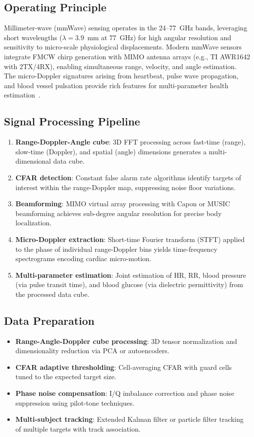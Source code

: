 \documentclass[journal,twoside]{IEEEtran}
\begin{document}
\subsection{Operating Principle}
Millimeter-wave (mmWave) sensing operates in the 24--77~GHz bands, leveraging short wavelengths ($\lambda = 3.9$~mm at 77~GHz) for high angular resolution and sensitivity to micro-scale physiological displacements. Modern mmWave sensors integrate FMCW chirp generation with MIMO antenna arrays (e.g., TI AWR1642 with 2TX/4RX), enabling simultaneous range, velocity, and angle estimation. The micro-Doppler signatures arising from heartbeat, pulse wave propagation, and blood vessel pulsation provide rich features for multi-parameter health estimation~\cite{ref_mmwave_review2023}.

\subsection{Signal Processing Pipeline}
\begin{enumerate}
\item \textbf{Range-Doppler-Angle cube}: 3D FFT processing across fast-time (range), slow-time (Doppler), and spatial (angle) dimensions generates a multi-dimensional data cube.
\item \textbf{CFAR detection}: Constant false alarm rate algorithms identify targets of interest within the range-Doppler map, suppressing noise floor variations.
\item \textbf{Beamforming}: MIMO virtual array processing with Capon or MUSIC beamforming achieves sub-degree angular resolution for precise body localization.
\item \textbf{Micro-Doppler extraction}: Short-time Fourier transform (STFT) applied to the phase of individual range-Doppler bins yields time-frequency spectrograms encoding cardiac micro-motion.
\item \textbf{Multi-parameter estimation}: Joint estimation of HR, RR, blood pressure (via pulse transit time), and blood glucose (via dielectric permittivity) from the processed data cube.
\end{enumerate}

\subsection{Data Preparation}
\begin{itemize}
\item \textbf{Range-Angle-Doppler cube processing}: 3D tensor normalization and dimensionality reduction via PCA or autoencoders.
\item \textbf{CFAR adaptive thresholding}: Cell-averaging CFAR with guard cells tuned to the expected target size.
\item \textbf{Phase noise compensation}: I/Q imbalance correction and phase noise suppression using pilot-tone techniques.
\item \textbf{Multi-subject tracking}: Extended Kalman filter or particle filter tracking of multiple targets with track association.
\end{itemize}
\end{document}
